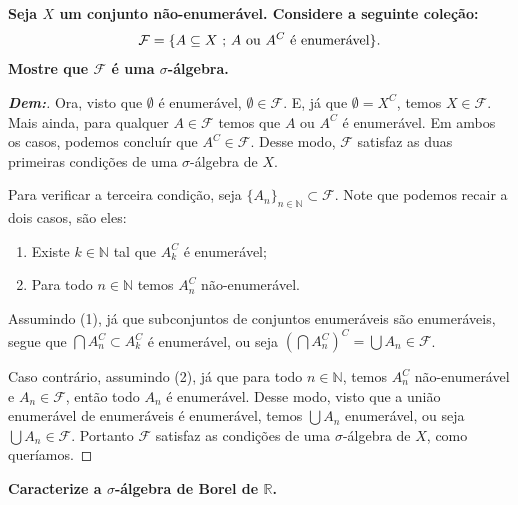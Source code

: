 \bigline
\textbf{Seja $X$ um conjunto não-enumerável. Considere a seguinte coleção:
$$\mathcal F = 
\{A \subseteq X \text{ ; }  A \text{ ou } A^C \text{ é enumerável}\}.$$ 
  Mostre que $\mathcal F$ é uma $\sigma$-álgebra.}
\begin{proof}[\textbf{Dem:}]
 Ora, visto que $\emptyset$ é enumerável, $\emptyset \in \mathcal F$. 
E, já que $\emptyset = X^C$, temos $X \in \mathcal F$. Mais ainda,
para qualquer $A \in \mathcal F$ temos que $A$ ou $A^C$ é enumerável. 
Em ambos os casos, podemos concluír que $A^C \in \mathcal F$. Desse modo, $\mathcal F$ 
satisfaz as duas primeiras condições de uma $\sigma$-álgebra de $X$.

Para verificar a terceira condição, seja 
$\{A_n\}_{n \in \mathbb N} \subset \mathcal F$. Note que 
podemos recair a dois casos, são eles:
\begin{enumerate}
  \item Existe $k \in \mathbb N$ tal que $A_k^C$ é enumerável;
  \item Para todo $n \in \mathbb N$ temos $A_n^C$ não-enumerável. 
\end{enumerate}

Assumindo (1), já que subconjuntos de conjuntos enumeráveis são 
enumeráveis, segue que $\bigcap A_n^C \subset A_k^C$ é enumerável, ou seja 
$\left(\bigcap A_n^C\right)^C = \bigcup A_n \in \mathcal F$. 

Caso contrário, assumindo (2), já que para todo $n \in \mathbb N$, 
temos $A_n^C$ não-enumerável e $A_n \in \mathcal F$, então todo $A_n$ é enumerável.
Desse modo, visto que a união enumerável de enumeráveis é enumerável, temos 
$\bigcup A_n$ enumerável, ou seja $\bigcup A_n \in \mathcal F$. Portanto 
$\mathcal F$ satisfaz as condições de uma $\sigma$-álgebra de $X$, 
como queríamos. 
\end{proof}
\biglinend
\newpage
{}
\bigline
\textbf{Caracterize a $\sigma$-álgebra de Borel de $\mathbb R$.}
\noindent\textbf{} 
